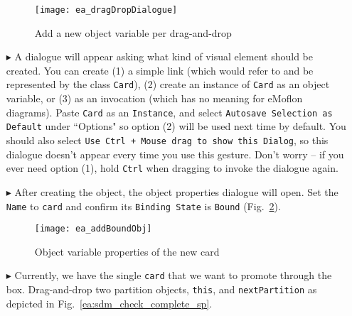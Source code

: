 \begin{itemize}
\vspace{0.5cm}

\begin{figure}[htbp]
\begin{center}
  \texttt{[image: ea\_dragDropDialogue]}
  \caption{Add a new object variable per drag-and-drop}
  \label{ea:sdm_check_bound_card}
\end{center}
\end{figure}

\item[$\blacktriangleright$] A dialogue will appear asking what kind of visual element should be created. You can create (1) a simple link (which would refer to
and be represented by the class \texttt{Card}), (2) create an instance of \texttt{Card} as an object variable, or (3) as an invocation (which has no meaning
for eMoflon diagrams). Paste \texttt{Card} as an \texttt{Instance}, and select \texttt{Autosave Selection as Default} under ``Options" so option (2) will be
used next time by default. You should also select \texttt{Use Ctrl + Mouse drag to show this Dialog}, so this dialogue doesn't appear every time you use this
gesture. Don't worry -- if you ever need option (1), hold \texttt{Ctrl} when dragging to invoke the dialogue again.

\vspace{0.5cm}

\item[$\blacktriangleright$] After creating the object, the object properties dialogue will open.  Set the \texttt{Name} to \texttt{card} and confirm its
\texttt{Binding State} is \texttt{Bound} (Fig.~\ref{ea:sdm_new_card_properties}).

\begin{figure}[htbp]
\begin{center}
  \texttt{[image: ea\_addBoundObj]}
  \caption{Object variable properties of the new card}
  \label{ea:sdm_new_card_properties}
\end{center}
\end{figure}

\vspace{0.5cm}

\item[$\blacktriangleright$] Currently, we have the single \texttt{card} that we want to promote through the box. Drag-and-drop two partition objects,
\texttt{this}, and \texttt{nextPartition} as depicted in Fig.~\ref{ea:sdm_check_complete_sp}.

\vspace{0.5cm}


\end{itemize}
